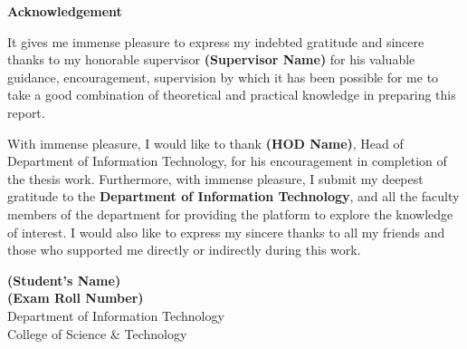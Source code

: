 \documentclass[a4paper,12pt]{report}
\begin{document}
\newpage
\thispagestyle{empty}     %

\begin{center}
    \textbf{\Large Acknowledgement}
\end{center}

\vspace{1cm}

It gives me immense pleasure to express my indebted gratitude and sincere thanks to my honorable supervisor \textbf{(Supervisor Name)} for his valuable guidance, encouragement, supervision by which it has been possible for me to take a good combination of theoretical and practical knowledge in preparing this report.

With immense pleasure, I would like to thank \textbf{(HOD Name)}, Head of Department of Information Technology, for his encouragement in completion of the thesis work. Furthermore, with immense pleasure, I submit my deepest gratitude to the \textbf{Department of Information Technology}, and all the faculty members of the department for providing the platform to explore the knowledge of interest. I would also like to express my sincere thanks to all my friends and those who supported me directly or indirectly during this work.

\vspace{1cm}

\begin{flushright}
    \textbf{(Student's Name)} \\
    \textbf{(Exam Roll Number)}\\
    Department of Information Technology \\
    College of Science \& Technology \\
\end{flushright}
\end{document}
